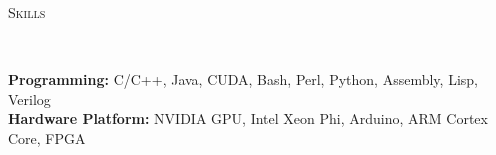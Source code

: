 \documentclass[a4paper, 12pt]{article}
\newenvironment{changemargin}[2]{%
  \begin{list}{}{%
      \setlength{\topsep}{0pt}%
      \setlength{\leftmargin}{#1}%
      \setlength{\rightmargin}{#2}%
      \setlength{\listparindent}{\parindent}%
      \setlength{\itemindent}{\parindent}%
      \setlength{\parsep}{\parskip}%
    }%
  \item[]}{\end{list}
}
\newcommand{\lineover}{
  \begin{changemargin}{-0.05in}{-0.05in}
    \vspace*{-8pt}
    \hrulefill \\
    \vspace*{-2pt}
  \end{changemargin}
}
\newcommand{\header}[1]{
  \begin{changemargin}{-0.6in}{-0.6in}
    \fontsize{15}{15}\scshape{#1}\\
    \lineover
    \vspace*{-4pt}
  \end{changemargin}
}
\newenvironment{body}
{
\vspace*{-16pt}
\begin{changemargin}{-0.25in}{-0.5in}
}
{
\end{changemargin}
}
\begin{document}
%
%
%

\smallskip
\header{Skills}
\begin{body}
  \vspace{14pt}
  \textbf{Programming:}{} C/C++, Java, CUDA, Bash, Perl, Python, Assembly, Lisp, Verilog\\
  \medskip
  \textbf{Hardware Platform:}{} NVIDIA GPU, Intel Xeon Phi, Arduino, ARM Cortex Core, FPGA\\
\end{body}
\end{document}
